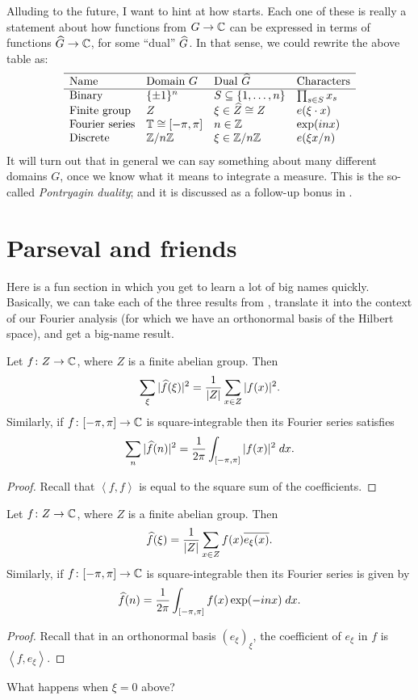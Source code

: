 Alluding to the future, I want to hint at how  starts.
Each one of these is really a statement
about how functions from $G \to \mathbb C$
can be expressed in terms of functions $\widehat G \to \mathbb C$,
for some ``dual'' $\widehat G$.
In that sense, we could rewrite the above table as:
\[
	\begin{array}{llll}
		\hline
		\text{Name} & \text{Domain }G & \text{Dual }\widehat G
			& \text{Characters} \\ \hline
		\text{Binary} & \{\pm1\}^n
			& S \subseteq \left\{ 1, \dots, n \right\}
			& \prod_{s \in S} x_s \\
		\text{Finite group} & Z
			& \xi \in \widehat Z \cong Z & e(\xi \cdot x) \\
		\text{Fourier series} & \mathbb T \cong [-\pi, \pi]  & n \in \mathbb Z
			& \exp(inx) \\
		\text{Discrete} & \mathbb Z/n\mathbb Z & \xi \in \mathbb Z/n\mathbb Z
			& e(\xi x / n) \\
	\end{array}
\]
It will turn out that in general
we can say something about many different domains $G$,
once we know what it means to integrate a measure.
This is the so-called \emph{Pontryagin duality};
and it is discussed as a follow-up bonus in .

\section{Parseval and friends}
Here is a fun section in which you get to learn a lot of big names quickly.
Basically, we can take each of the three results
from ,
translate it into the context of our Fourier analysis
(for which we have an orthonormal basis of the Hilbert space),
and get a big-name result.

\begin{corollary}
	Let $f \colon Z \to \mathbb C$, where $Z$ is a finite abelian group.
	Then \[ \sum_\xi |\widehat f(\xi)|^2 = \frac{1}{|Z|} \sum_{x \in Z} |f(x)|^2. \]
	Similarly, if $f \colon [-\pi, \pi] \to \mathbb C$ is square-integrable then
	its Fourier series satisfies
	\[ \sum_n |\widehat f(n)|^2 = \frac{1}{2\pi} \int_{[-\pi, \pi]} |f(x)|^2 \; dx. \]
\end{corollary}
\begin{proof}
Recall that $\left< f,f\right>$ is equal to the
square sum of the coefficients.
\end{proof}

\begin{corollary}
	Let $f \colon Z \to \mathbb C$, where $Z$ is a finite abelian group.
	Then \[ \widehat f(\xi) = \frac{1}{|Z|} \sum_{x \in Z} f(x) \overline{e_\xi(x)}. \]
	Similarly, if $f \colon [-\pi, \pi] \to \mathbb C$ is square-integrable then
	its Fourier series is given by
	\[ \widehat f(n) = \frac{1}{2\pi} \int_{[-\pi, \pi]} f(x) \exp(-inx) \; dx. \]
\end{corollary}
\begin{proof}
Recall that in an orthonormal basis $(e_\xi)_\xi$,
the coefficient of $e_\xi$ in $f$ is $\left< f, e_\xi\right>$.
\end{proof}
\begin{ques}
	What happens when $\xi = 0$ above?
\end{ques}

